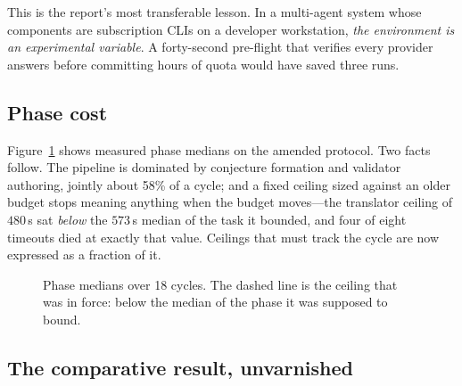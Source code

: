 \documentclass[11pt,a4paper]{article}
\begin{document}
This is the report's most transferable lesson. In a multi-agent system whose
components are subscription CLIs on a developer workstation, \emph{the
environment is an experimental variable}. A forty-second pre-flight that
verifies every provider answers before committing hours of quota would have
saved three runs.

\subsection{Phase cost}

Figure~\ref{fig:phases} shows measured phase medians on the amended protocol.
Two facts follow. The pipeline is dominated by conjecture formation and
validator authoring, jointly about 58\% of a cycle; and a fixed ceiling sized
against an older budget stops meaning anything when the budget moves---the
translator ceiling of $480$\,s sat \emph{below} the $573$\,s median of the task
it bounded, and four of eight timeouts died at exactly that value. Ceilings that
must track the cycle are now expressed as a fraction of it.

\begin{figure}[t]
\centering
{}
\caption{Phase medians over 18 cycles. The dashed line is the ceiling that was
in force: below the median of the phase it was supposed to bound.}
\label{fig:phases}
\end{figure}

\subsection{The comparative result, unvarnished}
\end{document}
